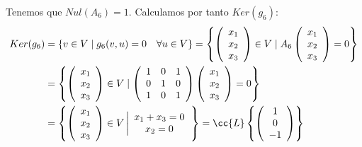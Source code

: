 \begin{ejercicio}
\begin{enumerate}
\begin{enumerate}
            Tenemos que $Nul(A_6)=1$. Calculamos por tanto $Ker(g_6)$:
            \begin{equation*}\begin{split}
                Ker(g_6) &= \{v \in V \mid g_6(v,u) = 0 \quad \forall u\in V\} 
                = \left\{ \left(\begin{array}{c}
                     x_1 \\ x_2 \\ x_3
                \end{array} \right) \in V \mid A_6
                \left(\begin{array}{c}
                     x_1 \\ x_2 \\ x_3
                \end{array} \right) = 0\right\} \\
                &= \left\{ \left(\begin{array}{c}
                     x_1 \\ x_2 \\ x_3
                \end{array} \right) \in V \mid
                \left(\begin{array}{ccc}
                    1 & 0 & 1 \\
                    0 & 1 & 0 \\
                    1 & 0 & 1 \\
                \end{array} \right) 
                \left(\begin{array}{c}
                     x_1 \\ x_2 \\ x_3
                \end{array} \right) = 0\right\} \\
                &= \left\{ \left(\begin{array}{c}
                     x_1 \\ x_2 \\ x_3
                \end{array} \right) \in V \left|\begin{array}{c}
                    x_1+x_3 = 0 \\
                    x_2=0
                \end{array}\right.\right\}
                = \cc{L} \left\{ \left(\begin{array}{c}
                     1 \\  0 \\ -1
                \end{array} \right)\right\}
            \end{split}\end{equation*}


\end{enumerate}
\end{enumerate}
\end{ejercicio}
